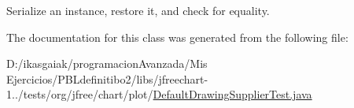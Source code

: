 Serialize an instance, restore it, and check for equality. 

The documentation for this class was generated from the following file\+:\begin{DoxyCompactItemize}
\item 
D\+:/ikasgaiak/programacion\+Avanzada/\+Mis Ejercicios/\+P\+B\+Ldefinitibo2/libs/jfreechart-\/1../tests/org/jfree/chart/plot/\mbox{\hyperlink{_default_drawing_supplier_test_8java}{Default\+Drawing\+Supplier\+Test.\+java}}\end{DoxyCompactItemize}
